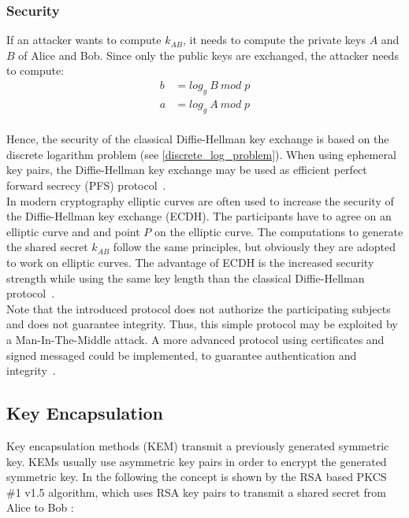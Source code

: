 \subsubsection{Security}
If an attacker wants to compute $k_{AB}$, it needs to compute the private keys $A$ and $B$ of Alice and Bob. Since only the public keys are exchanged, the attacker needs to compute:
\begin{equation*}
\begin{split}
b &= log_g\:B\:mod\;p\\ 
a &= log_g\:A\:mod\;p
\end{split}
\end{equation*}
\\
Hence, the security of the classical Diffie-Hellman key exchange is based on the discrete logarithm problem (see \ref{discrete_log_problem}). When using ephemeral key pairs, the Diffie-Hellman key exchange may be used as efficient perfect forward secrecy (PFS) protocol~\parencite{ITSicherheit}.
\\
In modern cryptography elliptic curves are often used to increase the security of the Diffie-Hellman key exchange (ECDH). The participants have to agree on an elliptic curve and and point $P$ on the elliptic curve. The computations to generate the shared secret $k_{AB}$ follow the same principles, but obviously they are adopted to work on elliptic curves. The advantage of ECDH is the increased security strength while using the same key length than the classical Diffie-Hellman protocol~\parencite{ITSicherheit}.
\\
Note that the introduced protocol does not authorize the participating subjects and does not guarantee integrity. Thus, this simple protocol may be exploited by a Man-In-The-Middle attack. A more advanced protocol using certificates and signed messaged could be implemented, to guarantee authentication and integrity~\parencite{ITSicherheit}.

\subsection{Key Encapsulation}

Key encapsulation methods (KEM) transmit a previously generated symmetric key. KEMs usually use asymmetric key pairs in order to encrypt the generated symmetric key. In the following the concept is shown by the RSA based PKCS \#1 v1.5 algorithm, which uses RSA key pairs to transmit a shared secret from Alice to Bob \parencite{rsakem}:

